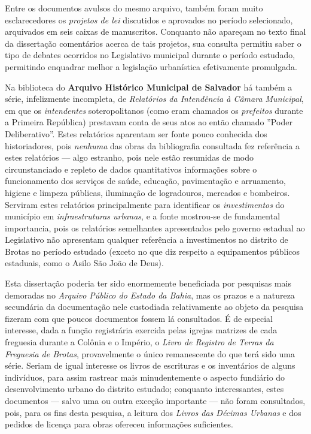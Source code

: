 Entre os documentos avulsos do mesmo arquivo, também foram muito esclarecedores os \textit{projetos de lei} discutidos e aprovados no período selecionado, arquivados em seis caixas de manuscritos. Conquanto não apareçam no texto final da dissertação comentários acerca de tais projetos, sua consulta permitiu saber o tipo de debates ocorridos no Legislativo municipal durante o período estudado, permitindo enquadrar melhor a legislação urbanística efetivamente promulgada.

Na biblioteca do \textbf{Arquivo Histórico Municipal de Salvador} há também a série, infelizmente incompleta, de \textit{Relatórios da Intendência à Câmara Municipal}, em que os \textit{intendentes} soteropolitanos (como eram chamados os \textit{prefeitos} durante a Primeira República) prestavam conta de seus atos ao então chamado ''Poder Deliberativo''. Estes relatórios aparentam ser fonte pouco conhecida dos historiadores, pois \textit{nenhuma} das obras da bibliografia consultada fez referência a estes relatórios --- algo estranho, pois nele estão resumidas de modo circunstanciado e repleto de dados quantitativos informações sobre o funcionamento dos serviços de saúde, educação, pavimentação e arruamento, higiene e limpeza públicas, iluminação de logradouros, mercados e bombeiros. Serviram estes relatórios principalmente para identificar os \textit{investimentos} do município em \textit{infraestruturas urbanas}, e a fonte mostrou-se de fundamental importancia, pois os relatórios semelhantes apresentados pelo governo estadual ao Legislativo não apresentam qualquer referência a investimentos no distrito de Brotas no período estudado (exceto no que diz respeito a equipamentos públicos estaduais, como o Asilo São João de Deus).

Esta dissertação poderia ter sido enormemente beneficiada por pesquisas mais demoradas no \textit{Arquivo Público do Estado da Bahia}, mas os prazos e a natureza secundária da documentação nele custodiada relativamente ao objeto da pesquisa fizeram com que poucos documentos fossem lá consultados. É de especial interesse, dada a função registrária exercida pelas igrejas matrizes de cada freguesia durante a Colônia e o Império, o \textit{Livro de Registro de Terras da Freguesia de Brotas}, provavelmente o único remanescente do que terá sido uma série. Seriam de igual interesse os livros de escrituras e os inventários de alguns indivíduos, para assim rastrear mais minudentemente o aspecto fundiário do desenvolvimento urbano do distrito estudado; conquanto interessantes, estes documentos --- salvo uma ou outra exceção importante --- não foram consultados, pois, para os fins desta pesquisa, a leitura dos \textit{Livros das Décimas Urbanas} e dos pedidos de licença para obras ofereceu informações suficientes.

